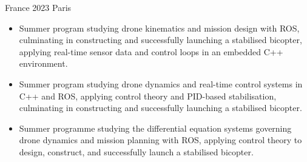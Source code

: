 {France}
{2023}
{Paris}
{\footnotesize\faCode \hspace{1pt}
}

\begin{itemize}

    \ifde
        \item Summer program studying drone kinematics and mission design with ROS, culminating in constructing and successfully launching a stabilised bicopter, applying real-time sensor data and control loops in an embedded C++ environment.
    \else
        \ifhpc
            \item Summer program studying drone dynamics and real-time control systems in C++ and ROS, applying control theory and PID-based stabilisation, culminating in constructing and successfully launching a stabilised bicopter.
        \else
            \item Summer programme studying the differential equation systems governing drone dynamics and mission planning with ROS, applying control theory to design, construct, and successfully launch a stabilised bicopter.
        \fi
    \fi

\end{itemize}

\medskip
